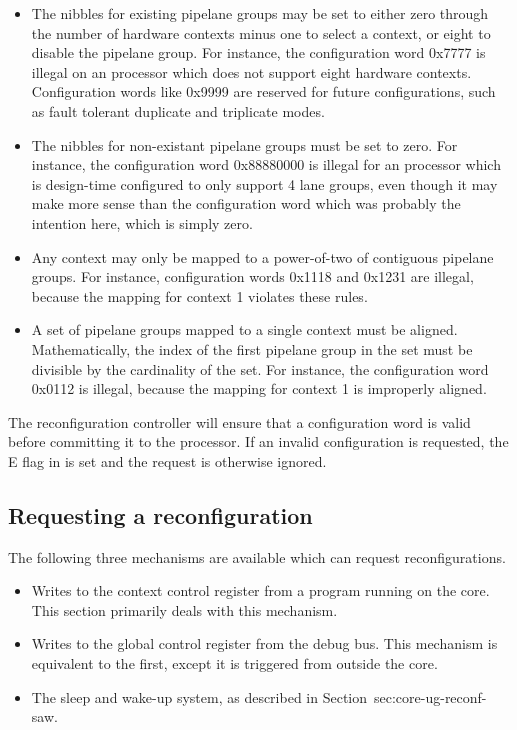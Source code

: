 \begin{itemize}

\item The nibbles for existing pipelane groups may be set to either zero through 
the number of hardware contexts minus one to select a context, or eight to 
disable the pipelane group. For instance, the configuration word 0x7777 is
illegal on an \rvex{} processor which does not support eight hardware contexts.
Configuration words like 0x9999 are reserved for future configurations, such as
fault tolerant duplicate and triplicate modes.

\item The nibbles for non-existant pipelane groups must be set to zero. For 
instance, the configuration word 0x88880000 is illegal for an \rvex{} processor 
which is design-time configured to only support 4 lane groups, even though it 
may make more sense than the configuration word which was probably the intention 
here, which is simply zero.

\item Any context may only be mapped to a power-of-two of contiguous pipelane
groups. For instance, configuration words 0x1118 and 0x1231 are illegal, because
the mapping for context 1 violates these rules.

\item A set of pipelane groups mapped to a single context must be aligned.
Mathematically, the index of the first pipelane group in the set must be
divisible by the cardinality of the set. For instance, the configuration word
0x0112 is illegal, because the mapping for context 1 is improperly aligned.

\end{itemize}

\noindent The reconfiguration controller will ensure that a configuration word 
is valid before committing it to the processor. If an invalid configuration is 
requested, the E flag in  is set and the request is otherwise ignored.

\subsection{Requesting a reconfiguration}
\label{sec:core-ug-reconf-request}

The following three mechanisms are available which can request reconfigurations.

\begin{itemize}

\item Writes to the  context control register from a program running
on the core. This section primarily deals with this mechanism.

\item Writes to the  global control register from the debug bus. This
mechanism is equivalent to the first, except it is triggered from outside the
core.

\item The sleep and wake-up system, as described in
Section~{sec:core-ug-reconf-saw}.

\end{itemize}

